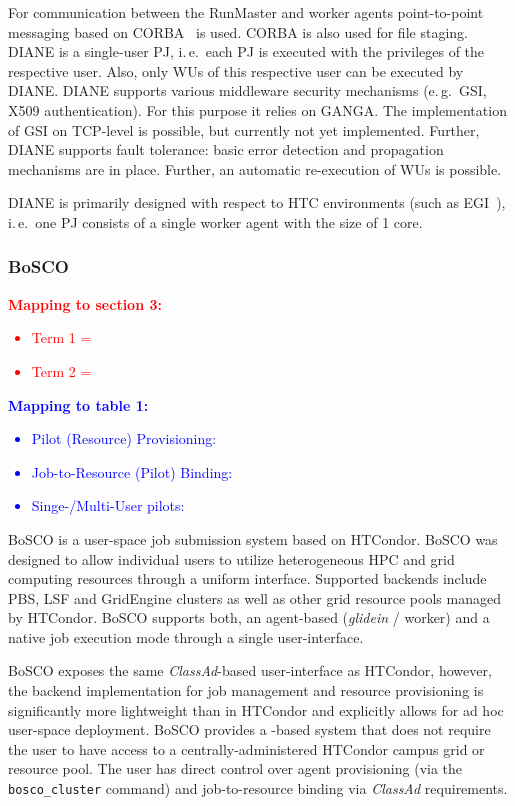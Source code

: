 \documentclass{sig-alternate}
\begin{document}
For communication between the RunMaster and
worker agents point-to-point messaging based on CORBA~\cite{OMG-CORBA303:2004}
is used. CORBA is also used for file staging.
DIANE is a single-user PJ, i.\,e.\ each PJ is executed with the
privileges of the respective user. Also, only WUs of this respective user can be
executed by DIANE. DIANE supports various middleware security mechanisms
(e.\,g.\ GSI, X509 authentication). For this purpose it relies on GANGA. The
implementation of GSI on TCP-level is possible, but currently not yet
implemented. Further, DIANE supports fault tolerance: basic error detection and
propagation mechanisms are in place. Further, an automatic re-execution of WUs
is possible.

DIANE is primarily designed with respect to HTC environments (such as
EGI~\cite{egi}), i.\,e.\ one PJ consists of a single worker agent with the
size of 1 core.

%
\subsubsection{BoSCO}

\textcolor{red}
{
\textbf{Mapping to section 3:}
\begin{itemize}
\item Term 1 =
\item Term 2 =
\end{itemize}
}

\textcolor{blue}
{
\textbf{Mapping to table 1:}
\begin{itemize}
\item Pilot (Resource) Provisioning:
\item Job-to-Resource (Pilot) Binding:
\item Singe-/Multi-User pilots:
\end{itemize}
}

BoSCO is a user-space job submission system based on HTCondor. BoSCO was
designed to allow individual users to utilize heterogeneous HPC and grid
computing resources through a uniform interface. Supported backends include PBS,
LSF and GridEngine clusters as well as other  grid resource pools managed by
HTCondor. BoSCO supports both, an agent-based (\textit{glidein} / worker) and
a native job execution mode through a single user-interface.

BoSCO exposes the same \textit{ClassAd}-based user-interface as HTCondor,
however, the backend implementation for job management and resource provisioning
is significantly more lightweight than in HTCondor and explicitly allows for ad
hoc user-space deployment. BoSCO provides a \pilotjob-based system that does not
require the user to have access to a centrally-administered HTCondor campus grid
or  resource pool. The user has direct control over \pilotjob agent provisioning
(via the \texttt{bosco\_cluster} command) and job-to-resource binding via
\textit{ClassAd} requirements.
\end{document}

